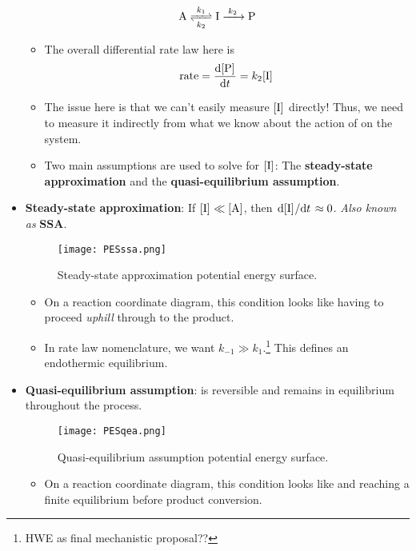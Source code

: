 \documentclass[../notes.tex]{subfiles}
\begin{document}
\begin{itemize}
    \begin{equation*}
        \ce{A <=>[$k_1$][$k_2$] I ->[$k_2$] P}
    \end{equation*}
    \begin{itemize}
        \item The overall differential rate law here is
        \begin{equation*}
            \rate = \dv{\cnc{P}}{t}
            = k_2\cnc{I}
        \end{equation*}
        \item The issue here is that we can't easily measure $\cnc{I}$ directly! Thus, we need to measure it indirectly from what we know about the action of  on the system.
        \item Two main assumptions are used to solve for $\cnc{I}$: The \textbf{steady-state approximation} and the \textbf{quasi-equilibrium assumption}.
    \end{itemize}
    \item \textbf{Steady-state approximation}: If $\cnc{I}\ll\cnc{A}$, then $\dv*{\cnc{I}}{t}\approx 0$. \emph{Also known as} \textbf{SSA}.
    \begin{figure}[h!]
        \centering
        \texttt{[image: PESssa.png]}
        \caption{Steady-state approximation potential energy surface.}
        \label{fig:PESssa}
    \end{figure}
    \begin{itemize}
        \item On a reaction coordinate diagram, this condition looks like  having to proceed \emph{uphill} through  to the product.
        \item In rate law nomenclature, we want $k_{-1}\gg k_1$.\footnote{HWE as final mechanistic proposal??} This defines an endothermic equilibrium.
    \end{itemize}
    \item \textbf{Quasi-equilibrium assumption}:  is reversible and remains in equilibrium throughout the process.
    \begin{figure}[h!]
        \centering
        \texttt{[image: PESqea.png]}
        \caption{Quasi-equilibrium assumption potential energy surface.}
        \label{fig:PESqea}
    \end{figure}
    \begin{itemize}
        \item On a reaction coordinate diagram, this condition looks like  and  reaching a finite equilibrium before product conversion.

\end{itemize}
\end{itemize}
\end{document}
